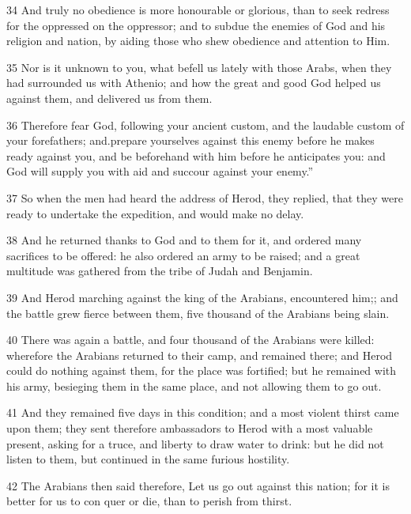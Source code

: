 \par 34 And truly no obedience is more honourable or glorious, than to seek redress for the oppressed on the oppressor; and to subdue the enemies of God and his religion and nation, by aiding those who shew obedience and attention to Him. 

\par 35 Nor is it unknown to you, what befell us lately with those Arabs, when they had surrounded us with Athenio; and how the great and good God helped us against them, and delivered us from them. 

\par 36 Therefore fear God, following your ancient custom, and the laudable custom of your forefathers; and.prepare yourselves against this enemy before he makes ready against you, and be beforehand with him before he anticipates you: and God will supply you with aid and succour against your enemy.” 

\par 37 So when the men had heard the address of Herod, they replied, that they were ready to undertake the expedition, and would make no delay. 

\par 38 And he returned thanks to God and to them for it, and ordered many sacrifices to be offered: he also ordered an army to be raised; and a great multitude was gathered from the tribe of Judah and Benjamin. 

\par 39 And Herod marching against the king of the Arabians, encountered him;; and the battle grew fierce between them, five thousand of the Arabians being slain. 

\par 40 There was again a battle, and four thousand of the Arabians were killed: wherefore the Arabians returned to their camp, and remained there; and Herod could do nothing against them, for the place was fortified; but he remained with his army, besieging them in the same place, and not allowing them to go out. 

\par 41 And they remained five days in this condition; and a most violent thirst came upon them; they sent therefore ambassadors to Herod with a most valuable present, asking for a truce, and liberty to draw water to drink: but he did not listen to them, but continued in the same furious hostility. 

\par 42 The Arabians then said therefore, Let us go out against this nation; for it is better for us to con quer or die, than to perish from thirst. 

